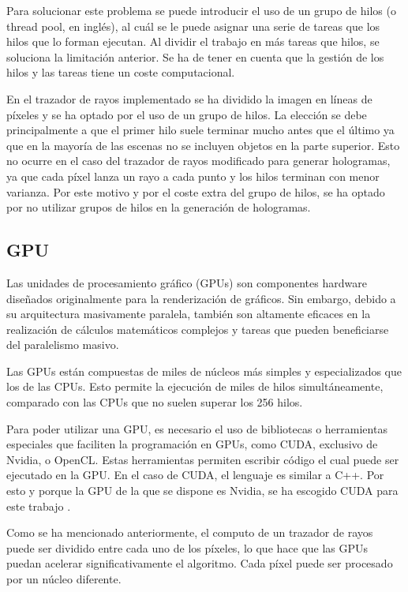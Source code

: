 \documentclass[10pt, a4paper]{article}
\begin{document}
Para solucionar este problema se puede introducir el uso de un grupo de hilos (o thread pool, en inglés), al cuál se le puede asignar una serie de tareas que los hilos que lo forman ejecutan. Al dividir el trabajo en más tareas que hilos, se soluciona la limitación anterior. Se ha de tener en cuenta que la gestión de los hilos y las tareas tiene un coste computacional.

En el trazador de rayos implementado se ha dividido la imagen en líneas de píxeles y se ha optado por el uso de un grupo de hilos. La elección se debe principalmente a que el primer hilo suele terminar mucho antes que el último ya que en la mayoría de las escenas no se incluyen objetos en la parte superior. Esto no ocurre en el caso del trazador de rayos modificado para generar hologramas, ya que cada píxel lanza un rayo a cada punto y los hilos terminan con menor varianza. Por este motivo y por el coste extra del grupo de hilos, se ha optado por no utilizar grupos de hilos en la generación de hologramas.

\subsection{GPU}

Las unidades de procesamiento gráfico (GPUs) son componentes hardware diseñados originalmente para la renderización de gráficos. Sin embargo, debido a su arquitectura masivamente paralela, también son altamente eficaces en la realización de cálculos matemáticos complejos y tareas que pueden beneficiarse del paralelismo masivo.

Las GPUs están compuestas de miles de núcleos más simples y especializados que los de las CPUs. Esto permite la ejecución de miles de hilos simultáneamente, comparado con las CPUs que no suelen superar los 256 hilos.

Para poder utilizar una GPU, es necesario el uso de bibliotecas o herramientas especiales que faciliten la programación en GPUs, como CUDA, exclusivo de Nvidia, o OpenCL. Estas herramientas permiten escribir código el cual puede ser ejecutado en la GPU. En el caso de CUDA, el lenguaje es similar a C++. Por esto y porque la GPU de la que se dispone es Nvidia, se ha escogido CUDA para este trabajo \cite{Nvidia:2024}.


Como se ha mencionado anteriormente, el computo de un trazador de rayos puede ser dividido entre cada uno de los píxeles, lo que hace que las GPUs puedan acelerar significativamente el algoritmo. Cada píxel puede ser procesado por un núcleo diferente.
\end{document}
